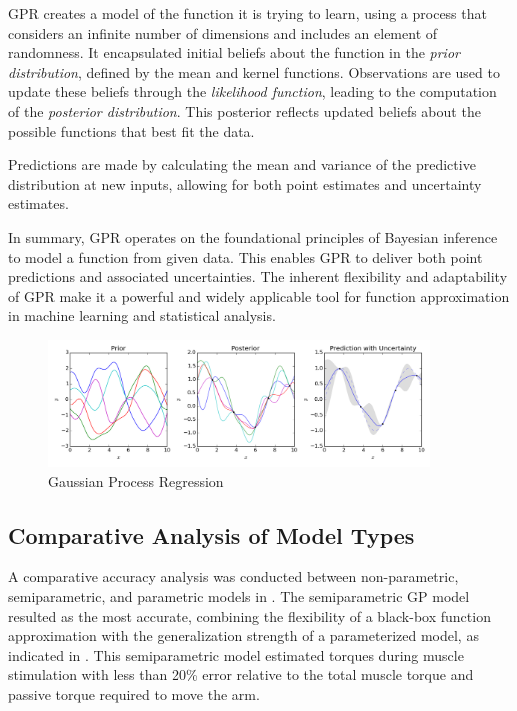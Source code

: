 GPR creates a model of the function it is trying to learn, using a process that considers an infinite number of dimensions and includes an element of randomness. It encapsulated initial beliefs about the function in the \textit{prior distribution}, defined by the mean and kernel functions. Observations are used to update these beliefs through the \textit{likelihood function}, leading to the computation of the \textit{posterior distribution}. This posterior reflects updated beliefs about the possible functions that best fit the data.

Predictions are made by calculating the mean and variance of the predictive distribution at new inputs, allowing for both point estimates and uncertainty estimates. 

In summary, GPR operates on the foundational principles of Bayesian inference to model a function from given data. This enables GPR to deliver both point predictions and associated uncertainties. The inherent flexibility and adaptability of GPR make it a powerful and widely applicable tool for function approximation in machine learning and statistical analysis. \cite{GPR}

\begin{figure}[h!]
    \centering
    \includegraphics[width=0.9\textwidth]{Pictures/Model/Gaussian_Process_Regression.png}
    \caption{Gaussian Process Regression \cite{GPR_Image}}
    \label{fig:GPR}
\end{figure}

\subsection{Comparative Analysis of Model Types}

A comparative accuracy analysis was conducted between non-parametric, semiparametric, and parametric models in \cite{SPI}. The semiparametric GP model resulted as the most accurate, combining the flexibility of a black-box function approximation with the generalization strength of a parameterized model, as indicated in \cite{SPI}. This semiparametric model estimated torques during muscle stimulation with less than 20\% error relative to the total muscle torque and passive torque required to move the arm. 


